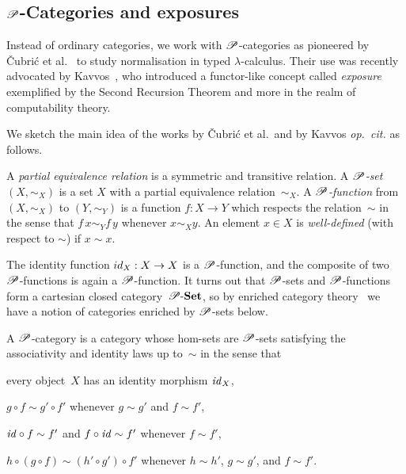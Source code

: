 \documentclass[a4paper,UKenglish,numberwithinsect,cleveref,thm-restate]{lipics-v2021}
\numberwithin{equation}{section}
\theoremstyle{plain}
\begin{document}
\subsection{\texorpdfstring{$\mathscr{P}$}{P}-Categories and exposures}
Instead of ordinary categories, we work with $\mathscr{P}$-categories as pioneered by \v{C}ubri\'c et al.~\cite{Cubric1998a} to study normalisation in typed $\lambda$-calculus.
Their use was recently advocated by Kavvos~\cite{Kavvos2017b}, who introduced a functor-like concept called \emph{exposure} exemplified by the Second Recursion Theorem and more in the realm of computability theory.

We sketch the main idea of the works by \v{C}ubri\'c et al.\ and by Kavvos \emph{op.\ cit.} as follows.
\begin{definition}
  A \emph{partial equivalence relation} is a symmetric and transitive relation.
  A \emph{$\mathscr{P}$-set} $(X, \sim_X)$ is a set $X$ with a partial equivalence relation~$\sim_X$.
  A \emph{$\mathscr{P}$-function} from $(X, \sim_X)$ to $(Y, \sim_Y)$ is a function $f\colon X \to Y$ which respects the relation~$\sim$ in the sense that $f\,x \sim_Y f\,y$ whenever $x \sim_X y$.
  An element $x \in X$ is \emph{well-defined} (with respect to $\sim$) if $x \sim x$.
\end{definition}
The identity function $\idfunc[X] : X \to X$ is a $\mathscr{P}$-function, and the composite of two $\mathscr{P}$-functions is again a $\mathscr{P}$-function.
It turns out that $\mathscr{P}$-sets and $\mathscr{P}$-functions form a cartesian closed category~$\mathscr{P}\text{-}\mathbf{Set}$, so by enriched category theory~\cite{Kelly1982} we have a notion of categories enriched by $\mathscr{P}$-sets below.

\begin{definition}
  A $\mathscr{P}$-category is a category whose hom-sets are $\mathscr{P}$-sets satisfying the associativity and identity laws up to~$\sim$ in the sense that 
  \begin{romanenumerate}
  \item every object~$X$ has an identity morphism $\mathit{id}_X$, 
  \item $g \circ f \sim g' \circ f'$ whenever $g\sim g'$ and $f \sim f'$,
  \item $\mathit{id} \circ f \sim f'$ and $f \circ \mathit{id} \sim f'$ whenever $f \sim f'$,
  \item $h \circ (g \circ f) \sim (h' \circ g') \circ f'$ whenever $h\sim h'$, $g \sim g'$, and $f \sim f'$.
  \end{romanenumerate}
\end{definition}
\end{document}
